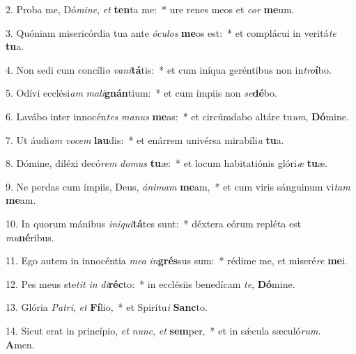 2. Proba me, Dó\textit{mi}\textit{ne}, \textit{et} \textbf{ten}ta me:~*  ure renes meos et \textit{cor} \textbf{me}um.\

3. Quóniam misericórdia tua ante \textit{ó}\textit{cu}\textit{los} \textbf{me}os est:~*  et complácui in veritá\textit{te} \textbf{tu}a.\

4. Non sedi cum concíli\textit{o} \textit{va}\textit{ni}\textbf{tá}tis:~*  et cum iníqua geréntibus non in\textit{tro}\textbf{í}bo.\

5. Odívi ecclési\textit{am} \textit{ma}\textit{li}\textbf{gnán}tium:~*  et cum ímpiis non \textit{se}\textbf{dé}bo.\

6. Lavábo inter innocén\textit{tes} \textit{ma}\textit{nus} \textbf{me}as:~*  et circúmdabo altáre tu\textit{um}, \textbf{Dó}mine.\

7. Ut áudi\textit{am} \textit{vo}\textit{cem} \textbf{lau}dis:~*  et enárrem univérsa mirabíli\textit{a} \textbf{tu}a.\

8. Dómine, diléxi decó\textit{rem} \textit{do}\textit{mus} \textbf{tu}æ:~*  et locum habitatiónis glóri\textit{æ} \textbf{tu}æ.\

9. Ne perdas cum ímpiis, Deus, \textit{á}\textit{ni}\textit{mam} \textbf{me}am,~*  et cum viris sánguinum vi\textit{tam} \textbf{me}am.\

10. In quorum mánibus \textit{in}\textit{i}\textit{qui}\textbf{tá}tes sunt:~*  déxtera eórum repléta est \textit{mu}\textbf{né}ribus.\

11. Ego autem in innocéntia \textit{me}\textit{a} \textit{in}\textbf{grés}sus sum:~*  rédime me, et miseré\textit{re} \textbf{me}i.\

12. Pes meus ste\textit{tit} \textit{in} \textit{di}\textbf{réc}to:~*  in ecclésiis benedícam \textit{te}, \textbf{Dó}mine.\

13. Glória \textit{Pa}\textit{tri}, \textit{et} \textbf{Fí}lio,~*  et Spirítu\textit{i} \textbf{Sanc}to.\

14. Sicut erat in princípio, \textit{et} \textit{nunc}, \textit{et} \textbf{sem}per,~*  et in sǽcula sæculó\textit{rum}. \textbf{A}men.\

